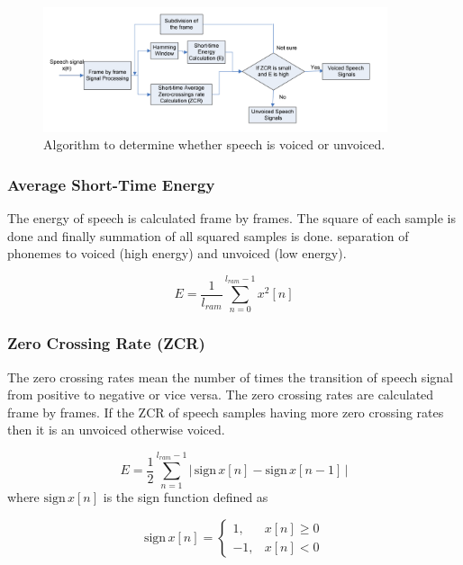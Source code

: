 \documentclass[12pt, a4paper, twoside]{report}
\begin{document}
\begin{figure}[!h]
	\centering
	\includegraphics[width=0.9\textwidth]
	{images/chapter2/algorithm-voiced-unvoiced}
	\caption{Algorithm to determine whether speech is voiced or unvoiced.}
	\label{fig:algorithm-voiced-unvoiced}
\end{figure}

\subsubsection{Average Short-Time Energy}
 The energy of speech is calculated frame by frames. The square of each sample is done and finally summation of all squared samples is done. separation of phonemes to voiced (high energy) and unvoiced (low energy).

\begin{equation}
E = \frac{1}{l_{ram}} \sum_{n=0}^{l_{ram} - 1} x^2 [n]
\end{equation}

\subsubsection{Zero Crossing Rate (ZCR)}
The zero crossing rates mean the number of times the transition of speech signal from positive to negative or vice versa. The zero crossing rates are calculated frame by frames. If the ZCR of speech samples having more zero crossing rates then it is an unvoiced otherwise voiced.

\begin{equation}
E = \frac{1}{2} \sum_{n=1}^{l_{ram} - 1} \left | \, \text{sign} \, x[n] - \text{sign} \, x[n-1] \, \right |
\end{equation}
where $\text{sign} \, x[n]$ is the sign function defined as

\begin{equation}
\text{sign} \, x[n] = \begin{cases}
1, & x[n] \geq 0 \\ 
-1, & x[n] < 0
\end{cases}
\end{equation}
\end{document}

